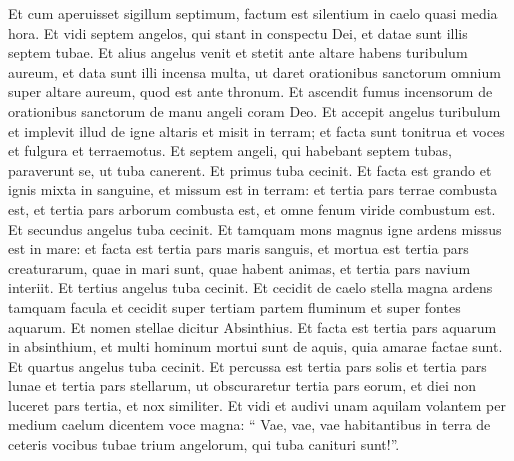 \begin{biblechapter}
\begin{biblechapter}
\begin{biblechapter}
\begin{biblechapter}
\begin{biblechapter}
\begin{biblechapter}
\begin{biblechapter}
\begin{biblechapter}
\verse Et cum aperuisset sigillum septimum, factum est silentium in caelo quasi media hora. 
\verse Et vidi septem angelos, qui stant in conspectu Dei, et datae sunt illis septem tubae. 
\verse Et alius angelus venit et stetit ante altare habens turibulum aureum, et data sunt illi incensa multa, ut daret orationibus sanctorum omnium super altare aureum, quod est ante thronum. 
\verse Et ascendit fumus incensorum de orationibus sanctorum de manu angeli coram Deo. 
\verse Et accepit angelus turibulum et implevit illud de igne altaris et misit in terram; et facta sunt tonitrua et voces et fulgura et terraemotus.
 \verse Et septem angeli, qui habebant septem tubas, paraverunt se, ut tuba canerent.
 \verse Et primus tuba cecinit. Et facta est grando et ignis mixta in sanguine, et missum est in terram: et tertia pars terrae combusta est, et tertia pars arborum combusta est, et omne fenum viride combustum est.
 \verse Et secundus angelus tuba cecinit. Et tamquam mons magnus igne ardens missus est in mare: et facta est tertia pars maris sanguis, 
\verse et mortua est tertia pars creaturarum, quae in mari sunt, quae habent animas, et tertia pars navium interiit.
 \verse Et tertius angelus tuba cecinit. Et cecidit de caelo stella magna ardens tamquam facula et cecidit super tertiam partem fluminum et super fontes aquarum. 
\verse Et nomen stellae dicitur Absinthius. Et facta est tertia pars aquarum in absinthium, et multi hominum mortui sunt de aquis, quia amarae factae sunt.
 \verse Et quartus angelus tuba cecinit. Et percussa est tertia pars solis et tertia pars lunae et tertia pars stellarum, ut obscuraretur tertia pars eorum, et diei non luceret pars tertia, et nox similiter.
 \verse Et vidi et audivi unam aquilam volantem per medium caelum dicentem voce magna: “ Vae, vae, vae habitantibus in terra de ceteris vocibus tubae trium angelorum, qui tuba canituri sunt!”.
 

\end{biblechapter}
\end{biblechapter}
\end{biblechapter}
\end{biblechapter}
\end{biblechapter}
\end{biblechapter}
\end{biblechapter}
\end{biblechapter}
